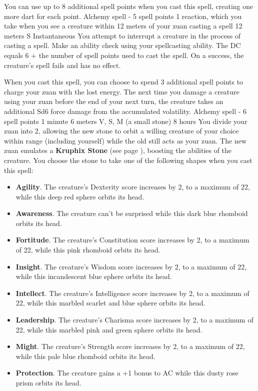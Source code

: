         You can use up to 8 additional spell points when you cast this spell, creating one more dart for each point.
        {Alchemy spell - 5 spell points}
        {1 reaction, which you take when you see a creature within 12 meters of your zuan casting a spell}
        {12 meters}
        {S}
        {Instantaneous}
        You attempt to interrupt a creature in the process of casting a spell.
        Make an ability check using your spellcasting ability.
        The DC equals 6 + the number of spell points used to cast the spell.
        On a success, the creature's spell fails and has no effect.

        When you cast this spell, you can choose to spend 3 additional spell points to charge your zuan with the lost energy.
        The next time you damage a creature using your zuan before the end of your next turn, the creature takes an additional Sd6 force damage from the accumulated volatility.
        {Alchemy spell - 6 spell points}
        {1 minute}
        {6 meters}
        {V, S, M (a small stone)}
        {8 hours}
        You divide your zuan into 2, allowing the new stone to orbit a willing creature of your choice within range (including yourself) while the old still acts as your zuan.
        The new zuan emulates a \textbf{Kruphix Stone} (see page \pageref{item::kruphixstone}), boosting the abilities of the creature.
        You choose the stone to take one of the following shapes when you cast this spell:
        \begin{itemize}
            \item \textbf{Agility}.
            The creature's Dexterity score increases by 2, to a maximum of 22, while this deep red sphere orbits its head.
            \item \textbf{Awareness}.
            The creature can't be surprised while this dark blue rhomboid orbits its head.
            \item \textbf{Fortitude}.
            The creature's Constitution score increases by 2, to a maximum of 22, while this pink rhomboid orbits its head.
            \item \textbf{Insight}.
            The creature's Wisdom score increases by 2, to a maximum of 22, while this incandescent blue sphere orbits its head.
            \item \textbf{Intellect}.
            The creature's Intelligence score increases by 2, to a maximum of 22, while this marbled scarlet and blue sphere orbits its head.
            \item \textbf{Leadership}.
            The creature's Charisma score increases by 2, to a maximum of 22, while this marbled pink and green sphere orbits its head.
            \item \textbf{Might}.
            The creature's Strength score increases by 2, to a maximum of 22, while this pale blue rhomboid orbits its head.
            \item \textbf{Protection}.
            The creature gains a +1 bonus to AC while this dusty rose prism orbits its head.
        \end{itemize}

